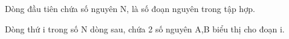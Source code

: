 Dòng đầu tiên chứa số nguyên N, là số đoạn nguyên trong tập hợp.  

   Dòng thứ i trong số N dòng sau, chứa 2 số nguyên A,B  biểu thị cho đoạn i.